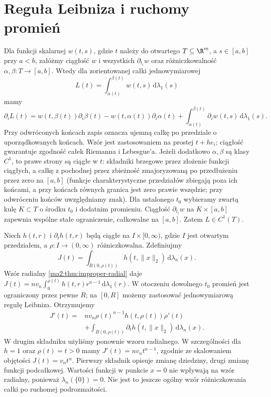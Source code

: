 \section{Reguła Leibniza i ruchomy promień}

Dla funkcji skalarnej $w(t,s)$, gdzie $t$ należy
do otwartego $T\subseteq\R^m$, a $s\in[a,b]$
przy $a<b$,
załóżmy ciągłość $w$ i wszystkich $\partial_{t_i}w$
oraz różniczkowalność $\alpha,\beta:T\to[a,b]$.
Wtedy dla zorientowanej całki jednowymiarowej
\[
 L(t)=\int_{\alpha(t)}^{\beta(t)}w(t,s)\,
 \mathrm d\lambda_1(s)
\]
mamy
\[
 \partial_i L(t)=
 w(t,\beta(t))\partial_i\beta(t)
 -w(t,\alpha(t))\partial_i\alpha(t)
 +\int_{\alpha(t)}^{\beta(t)}
   \partial_iw(t,s)\,\mathrm d\lambda_1(s).
\]
Przy odwróconych końcach zapis oznacza ujemną całkę
po przedziale o uporządkowanych końcach.
Wzór jest zastosowaniem
na prostej $t+h e_i$; ciągłość gwarantuje zgodność
całek Riemanna i Lebesgue'a. Jeżeli dodatkowo
$\alpha,\beta$ są klasy $C^1$, to prawe strony
są ciągłe w $t$: składniki brzegowe przez złożenie
funkcji ciągłych, a całkę z pochodnej przez
zbieżność zmajoryzowaną po przedłużeniu przez zero
na $[a,b]$ (funkcje charakterystyczne przedziałów
zbiegają poza ich końcami, a przy końcach równych
granica jest zero prawie wszędzie; przy odwróceniu
końców uwzględniamy znak). Dla ustalonego $t_0$
wybieramy zwartą kulę $K\subset T$ o środku $t_0$
i dodatnim promieniu. Ciągłość $\partial_{t_i}w$
na $K\times[a,b]$ zapewnia wspólne stałe ograniczenie,
całkowalne na $[a,b]$. Zatem $L\in C^1(T)$.

\begin{przyklad}
\label{ma2:ex:parameter-radial-leibniz}
Niech $h(t,r)$ i $\partial_t h(t,r)$ będą ciągłe
na $I\times[0,\infty)$, gdzie $I$ jest otwartym
przedziałem, a $\rho:I\to(0,\infty)$ różniczkowalna.
Zdefiniujmy
\[
 J(t)=\int_{B(0,\rho(t))}h(t,\|x\|_2)
 \,\mathrm d\lambda_n(x).
\]
Wzór radialny \ref{ma2:thm:improper-radial}
daje $J(t)=nv_n\int_0^{\rho(t)}h(t,r)r^{n-1}
\,\mathrm d\lambda_1(r)$.
W otoczeniu dowolnego $t_0$ promień jest
ograniczony przez pewne $R$; na $[0,R]$ możemy
zastosować jednowymiarową regułę Leibniza.
Otrzymujemy
\[
 \begin{split}
 J'(t)={}&nv_n\rho(t)^{n-1}h(t,\rho(t))\rho'(t)\\
 &+\int_{B(0,\rho(t))}\partial_t h(t,\|x\|_2)
 \,\mathrm d\lambda_n(x).
 \end{split}
\]
W drugim składniku użyliśmy ponownie wzoru radialnego.
W szczególności dla $h=1$ oraz $\rho(t)=t>0$
mamy $J'(t)=nv_nt^{n-1}$, zgodnie ze skalowaniem
objętości $J(t)=v_nt^n$.
Pierwszy składnik opisuje zmianę dziedziny,
drugi zmianę funkcji podcałkowej.
Wartości funkcji w punkcie $x=0$ nie wpływają na
wzór radialny, ponieważ $\lambda_n(\{0\})=0$.
Nie jest to jeszcze ogólny wzór różniczkowania
całki po ruchomej podrozmaitości.
\end{przyklad}


